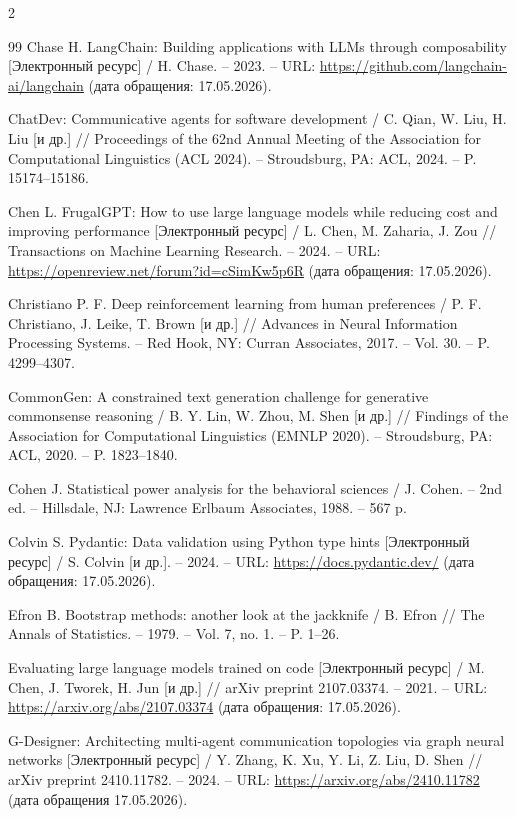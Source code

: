 \begin{multicols}{2}
\begin{thebibliography}{99}
Chase H. LangChain: Building applications with LLMs through
composability [Электронный ресурс] / H. Chase. -- 2023.
-- URL: \url{https://github.com/langchain-ai/langchain} (дата
обращения: 17.05.2026).

ChatDev: Communicative agents for software development
/ C. Qian, W. Liu, H. Liu [и др.] // Proceedings of the 62nd
Annual Meeting of the Association for Computational Linguistics
(ACL 2024). -- Stroudsburg, PA: ACL, 2024. -- P. 15174--15186.

Chen L. FrugalGPT: How to use large language models while
reducing cost and improving performance [Электронный ресурс]
/ L. Chen, M. Zaharia, J. Zou // Transactions on Machine
Learning Research. -- 2024.
-- URL: \url{https://openreview.net/forum?id=cSimKw5p6R} (дата
обращения: 17.05.2026).

Christiano P. F. Deep reinforcement learning from human
preferences / P. F. Christiano, J. Leike, T. Brown [и др.]
// Advances in Neural Information Processing Systems. -- Red
Hook, NY: Curran Associates, 2017. -- Vol. 30. -- P. 4299--4307.

CommonGen: A constrained text generation challenge for generative
commonsense reasoning / B. Y. Lin, W. Zhou, M. Shen [и др.]
// Findings of the Association for Computational Linguistics
(EMNLP 2020). -- Stroudsburg, PA: ACL, 2020. -- P. 1823--1840.

Cohen J. Statistical power analysis for the behavioral sciences
/ J. Cohen. -- 2nd ed. -- Hillsdale, NJ: Lawrence Erlbaum
Associates, 1988. -- 567 p.

Colvin S. Pydantic: Data validation using Python type hints
[Электронный ресурс] / S. Colvin [и др.]. -- 2024.
-- URL: \url{https://docs.pydantic.dev/} (дата обращения: 17.05.2026).

Efron B. Bootstrap methods: another look at the jackknife
/ B. Efron // The Annals of Statistics. -- 1979. -- Vol. 7,
no. 1. -- P. 1--26.

Evaluating large language models trained on code [Электронный
ресурс] / M. Chen, J. Tworek, H. Jun [и др.]
// arXiv preprint 2107.03374. -- 2021.
-- URL: \url{https://arxiv.org/abs/2107.03374} (дата обращения: 17.05.2026).

G-Designer: Architecting multi-agent communication topologies
via graph neural networks [Электронный ресурс] / Y. Zhang,
K. Xu, Y. Li, Z. Liu, D. Shen // arXiv preprint 2410.11782.
-- 2024. -- URL: \url{https://arxiv.org/abs/2410.11782} (дата
обращения 17.05.2026).


\end{thebibliography}
\end{multicols}
